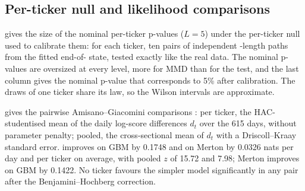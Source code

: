 \begin{table}[tbp]
  \centering
  \caption{Real \TEST{} windows against real \TRAIN{} windows (E1(c)): 3000 against 6200 windows,
    $L=20$, dependent protocol, ten test seeds. Median statistic (\WC{}: critic mean difference;
    \LRC{}: mean logit difference; C2ST: evaluation accuracy; MMD and \SigMMD{}: unbiased
    $\MMD^2$; KS: $D$), median p-value, $\pmed$ and share of seeds with $p\le0.05$. Last column:
    rejection rate at 5\% of the same comparison in the stationary simulated placebo (E1(a),
    joint cell, $\Rnew^*$ against $\Rpast^*$, 200 replications, Wilson 95\% interval).
    $^{\star}$Protocol p-value. Same numbers as the generated table \texttt{e1\_nonstat.tex}
    without its units and median $\zhac$ columns.}
  \label{tab:e1-nonstat}
  \small
\end{table}

\subsection{Per-ticker null and likelihood comparisons}\label{app:emp-perticker}

 gives the size of the nominal per-ticker p-values ($L=5$) under the
per-ticker \GARCHt{} null used to calibrate them: for each ticker, ten pairs of independent
\TEST{}-length paths from the fitted end-of-\TRAIN{} state, tested exactly like the real data. The
nominal p-values are oversized at every level, more for MMD than for the \WC{} test, and the last
column gives the nominal p-value that corresponds to 5\% after calibration. The draws of one
ticker share its law, so the Wilson intervals are approximate.

 gives the pairwise Amisano--Giacomini comparisons
\citep{amisano2007comparing}: per ticker, the HAC-studentised mean of the daily log-score
differences $d_t$ over the 615 \TEST{} days, without parameter penalty; pooled,
the cross-sectional mean of $d_t$ with a Driscoll--Kraay standard error. \GARCHt{} improves on GBM
by 0.1748 and on Merton by 0.0326 nats per day and per ticker on average, with pooled $z$ of 15.72
and 7.98; Merton improves on GBM by 0.1422. No ticker favours the simpler model significantly in
any pair after the Benjamini--Hochberg correction.

\begin{table}[tbp]
  \centering
  \caption{Size of the nominal per-ticker p-values under the per-ticker \GARCHt{} null (E3,
    $L=5$, 123 windows per sample): 10 independent pairs of \TEST{}-length paths per ticker, 1000
    in all; Wilson 95\% intervals (approximate: pairs of one ticker share its law). Last column:
    5\% quantile of the null p-values, the nominal p-value that corresponds to 5\% after
    calibration.}
  \label{tab:e3-perticker-null}
  \small
\end{table}

